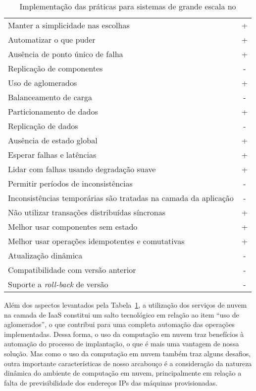 \begin{table}[!t]
\begin{center}
    \begin{tabular}{l c}
	 \hline
Manter a simplicidade nas escolhas & +\\
Automatizar o que puder & + \\
Ausência de ponto único de falha & + \\
Replicação de componentes & - \\
Uso de aglomerados & + \\
Balanceamento de carga & - \\
Particionamento de dados & + \\
Replicação de dados & - \\
Ausência de estado global & +  \\%
Esperar falhas e latências & +  \\
Lidar com falhas usando degradação suave & + \\
Permitir períodos de inconsistências & - \\
Inconsistências temporárias são tratadas na camada da aplicação & - \\
Não utilizar transações distribuídas síncronas & + \\
Melhor usar componentes sem estado  & + \\%
Melhor usar operações idempotentes e comutativas  & +\\
Atualização dinâmica  & -\\
Compatibilidade com versão anterior  & -\\
Suporte a \emph{roll-back} de versão & - \\
	 \hline
    \end{tabular}
  \caption{Implementação das práticas para sistemas de grande escala no \ee}
  \label{tab:escala_ee}
\end{center}
\end{table}

Além dos aspectos levantados pela Tabela~\ref{tab:escala_ee}, a utilização dos serviços de nuvem na camada de IaaS constitui um salto tecnológico em relação ao item ``uso de aglomerados'', o que contribui para uma completa automação das operações implementadas. Dessa forma, o uso da computação em nuvem traz benefícios à automação do processo de implantação, o que é mais uma vantagem de nossa solução. Mas como o uso da computação em nuvem também traz alguns desafios, outra importante características de nosso arcabouço é a consideração da natureza dinâmica do ambiente de computação em nuvem, principalmente em relação a falta de previsibilidade dos endereços IPs das máquinas provisionadas.

